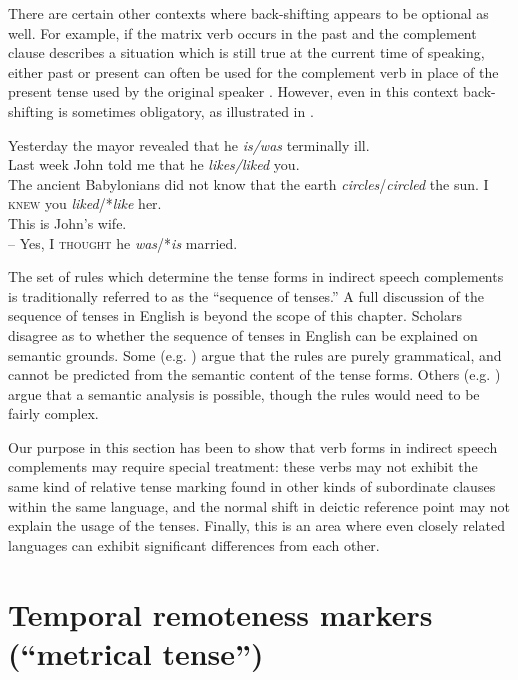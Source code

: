There are certain other contexts where back-shifting appears to be optional as well. For example, if the matrix verb occurs in the past and the complement clause describes a situation which is still true at the current time of speaking, either past or present can often be used for the complement verb in place of the present tense used by the original speaker . However, even in this context back-shifting is sometimes obligatory, as illustrated in .


\ea \label{ex:21.34}
\ea  Yesterday the mayor revealed that he \textit{is/was} terminally ill.\\
\ex Last week John told me that he \textit{likes/liked} you.\\
\ex The ancient Babylonians did not know that the earth \textit{circles}/\textit{circled} the sun.
    \z
\ex \label{ex:21.35}
\ea  I \textsc{knew} you \textit{liked}/*\textit{like} her.\\
\ex This is John’s wife.\\
  – Yes, I \textsc{thought} he \textit{was}/*\textit{is} married.
    \z
\z


The set of rules which determine the tense forms in indirect speech complements is traditionally referred to as the “sequence of tenses.” A full discussion of the sequence of tenses in English is beyond the scope of this chapter. Scholars disagree as to whether the sequence of tenses in English can be explained on semantic grounds. Some (e.g. \citealt{Comrie1985}) argue that the rules are purely grammatical, and cannot be predicted from the semantic content of the tense forms. Others (e.g. \citealt{Declerck1991}) argue that a semantic analysis is possible, though the rules would need to be fairly complex.



Our purpose in this section has been to show that verb forms in indirect speech complements may require special treatment: these verbs may not exhibit the same kind of relative tense marking found in other kinds of subordinate clauses within the same language, and the normal shift in deictic reference point may not explain the usage of the tenses. Finally, this is an area where even closely related languages can exhibit significant differences from each other.


\section{Temporal remoteness markers (“metrical tense”)}\label{sec:21.5}

